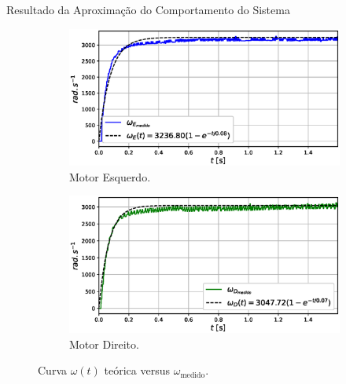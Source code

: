 \begin{frame}{Resultado da Aproximação do Comportamento do Sistema}


\begin{figure}
    \begin{subfigure}{.45\textwidth}
        \centering
        \includegraphics[width=\textwidth]{figuras/resultados/exp01/regressao_vs_medido_esquerdo100.eps}
        \caption{Motor Esquerdo.}
    \end{subfigure}
    \begin{subfigure}{.45\textwidth}
        \centering
        \includegraphics[width=\textwidth]{figuras/resultados/exp01/regressao_vs_medido_direito100.eps}
        \caption{Motor Direito.}
    \end{subfigure}
    \caption{Curva $\omega(t)$ teórica versus $\omega_{\text{medido}}$.}
\end{figure}
    
\end{frame}


